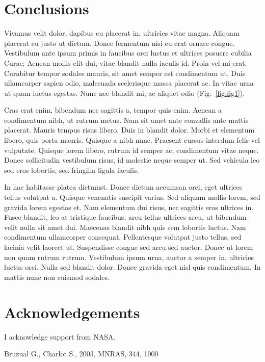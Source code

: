 \documentclass{iau}
\newcommand{\mnras}{MNRAS}       %
\begin{document}
\section{Conclusions}

Vivamus velit dolor, dapibus eu placerat in, ultricies vitae magna. Aliquam placerat eu justo ut dictum. Donec fermentum nisi eu erat ornare congue. Vestibulum ante ipsum primis in faucibus orci luctus et ultrices posuere cubilia Curae; Aenean mollis elit dui, vitae blandit nulla iaculis id. Proin vel mi erat. Curabitur tempor sodales mauris, sit amet semper est condimentum ut. Duis ullamcorper sapien odio, malesuada scelerisque massa placerat ac. In vitae urna ut quam luctus egestas. Nunc nec blandit mi, ac aliquet odio (Fig.~\ref{fig:fig1}).



Cras erat enim, bibendum nec sagittis a, tempor quis enim. Aenean a condimentum nibh, ut rutrum metus. Nam sit amet ante convallis ante mattis placerat. Mauris tempus risus libero. Duis in blandit dolor. Morbi et elementum libero, quis porta mauris. Quisque a nibh nunc. Praesent cursus interdum felis vel vulputate. Quisque lorem libero, rutrum id semper ac, condimentum vitae neque. Donec sollicitudin vestibulum risus, id molestie neque semper ut. Sed vehicula leo sed eros lobortis, sed fringilla ligula iaculis.

In hac habitasse platea dictumst. Donec dictum accumsan orci, eget ultrices tellus volutpat a. Quisque venenatis suscipit varius. Sed aliquam mollis lorem, sed gravida lorem egestas et. Nam elementum dui risus, nec sagittis eros ultrices in. Fusce blandit, leo at tristique faucibus, arcu tellus ultrices arcu, ut bibendum velit nulla sit amet dui. Maecenas blandit nibh quis sem lobortis luctus. Nam condimentum ullamcorper consequat. Pellentesque volutpat justo tellus, sed lacinia velit laoreet ut. Suspendisse congue sed arcu sed auctor. Donec ut lorem non quam rutrum rutrum. Vestibulum ipsum urna, auctor a semper in, ultricies luctus orci. Nulla sed blandit dolor. Donec gravida eget nisl quis condimentum. In mattis nunc non euismod sodales.

\section*{Acknowledgements}

\noindent
I acknowledge support from NASA.

\begin{thebibliography}{99}

{Bruzual} G., {Charlot} S., 2003, \mnras, 344, 1000

\end{thebibliography}
\end{document}
